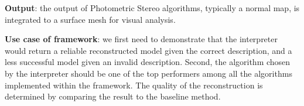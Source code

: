 \noindent\textbf{Output}: the output of Photometric Stereo algorithms, typically a normal map, is integrated to a surface mesh for visual analysis.

\noindent\textbf{Use case of framework}: we first need to demonstrate that the interpreter would return a reliable reconstructed model given the correct description, and a less successful model given an invalid description. Second, the algorithm chosen by the interpreter should be one of the top performers among all the algorithms implemented within the framework. The quality of the reconstruction is determined by comparing the result to the baseline method.





